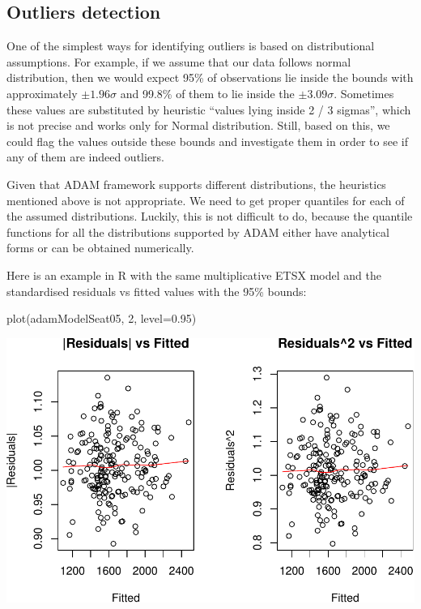\documentclass[
]{book}
\newenvironment{Shaded}{\begin{snugshade}}{\end{snugshade}}
\newcommand{\AttributeTok}[1]{\textcolor[rgb]{0.77,0.63,0.00}{#1}}
\newcommand{\DecValTok}[1]{\textcolor[rgb]{0.00,0.00,0.81}{#1}}
\newcommand{\FloatTok}[1]{\textcolor[rgb]{0.00,0.00,0.81}{#1}}
\newcommand{\FunctionTok}[1]{\textcolor[rgb]{0.00,0.00,0.00}{#1}}
\newcommand{\NormalTok}[1]{#1}
\theoremstyle{definition}
\theoremstyle{definition}
\theoremstyle{definition}
\theoremstyle{definition}
\theoremstyle{remark}
\begin{document}
\hypertarget{outliers-detection}{%
\subsection{Outliers detection}\label{outliers-detection}}

One of the simplest ways for identifying outliers is based on distributional assumptions. For example, if we assume that our data follows normal distribution, then we would expect 95\% of observations lie inside the bounds with approximately \(\pm 1.96\sigma\) and 99.8\% of them to lie inside the \(\pm3.09 \sigma\). Sometimes these values are substituted by heuristic ``values lying inside 2 / 3 sigmas'', which is not precise and works only for Normal distribution. Still, based on this, we could flag the values outside these bounds and investigate them in order to see if any of them are indeed outliers.

Given that ADAM framework supports different distributions, the heuristics mentioned above is not appropriate. We need to get proper quantiles for each of the assumed distributions. Luckily, this is not difficult to do, because the quantile functions for all the distributions supported by ADAM either have analytical forms or can be obtained numerically.

Here is an example in R with the same multiplicative ETSX model and the standardised residuals vs fitted values with the 95\% bounds:

\begin{Shaded}
\begin{Highlighting}[]
\FunctionTok{plot}\NormalTok{(adamModelSeat05, }\DecValTok{2}\NormalTok{, }\AttributeTok{level=}\FloatTok{0.95}\NormalTok{)}
\end{Highlighting}
\end{Shaded}

\includegraphics{adam_files/figure-latex/unnamed-chunk-134-1.pdf}
\end{document}
